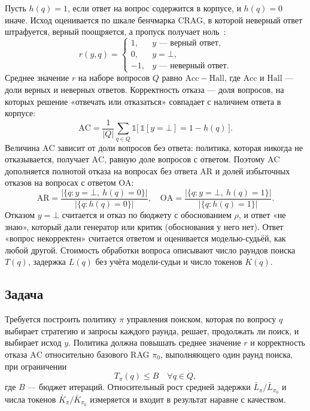 \documentclass{misisarticle}
\begin{document}
Пусть $h(q) = 1$, если ответ на вопрос содержится в корпусе, и $h(q) = 0$ иначе.
Исход оценивается по шкале бенчмарка CRAG, в которой неверный ответ штрафуется, верный поощряется, а пропуск получает ноль~\cite{yang2024crag}: %
\begin{equation}
  r(y, q) =
  \begin{cases}
    1, & y \text{ --- верный ответ},\\
    0, & y = \bot,\\
    -1, & y \text{ --- неверный ответ}.
  \end{cases}
  \label{eq:score}
\end{equation}
Среднее значение $r$ на наборе вопросов $Q$ равно $\mathrm{Acc} - \mathrm{Hall}$, где $\mathrm{Acc}$ и $\mathrm{Hall}$ --- доли верных и неверных ответов.
Корректность отказа --- доля вопросов, на которых решение «отвечать или отказаться» совпадает с наличием ответа в корпусе:
\begin{equation}
  \mathrm{AC} = \frac{1}{|Q|} \sum_{q \in Q} \mathbb{1}\bigl[\, \mathbb{1}[y = \bot] = 1 - h(q) \,\bigr].
  \label{eq:ac}
\end{equation}
Величина $\mathrm{AC}$ зависит от доли вопросов без ответа: политика, которая никогда не отказывается, получает $\mathrm{AC}$, равную доле вопросов с ответом.
Поэтому $\mathrm{AC}$ дополняется полнотой отказа на вопросах без ответа $\mathrm{AR}$ и долей избыточных отказов на вопросах с ответом $\mathrm{OA}$:
\begin{equation}
  \mathrm{AR} = \frac{|\{q : y = \bot,\ h(q) = 0\}|}{|\{q : h(q) = 0\}|}, \quad
  \mathrm{OA} = \frac{|\{q : y = \bot,\ h(q) = 1\}|}{|\{q : h(q) = 1\}|}.
  \label{eq:ar-oa}
\end{equation}
Отказом $y = \bot$ считается и отказ по бюджету с обоснованием $\rho$, и ответ «не знаю», который дали генератор или критик (обоснования у него нет).
Ответ «вопрос некорректен» считается ответом и оценивается моделью-судьёй, как любой другой.
Стоимость обработки вопроса описывают число раундов поиска $T(q)$, задержка $L(q)$ без учёта модели-судьи и число токенов $K(q)$.

\subsection{Задача}

Требуется построить политику $\pi$ управления поиском, которая по вопросу $q$ выбирает стратегию и запросы каждого раунда, решает, продолжать ли поиск, и выбирает исход $y$.
Политика должна повышать среднее значение $r$ и корректность отказа $\mathrm{AC}$ относительно базового RAG $\pi_0$, выполняющего один раунд поиска, при ограничении
\begin{equation}
  T_{\pi}(q) \le B \quad \forall q \in Q,
  \label{eq:budget}
\end{equation}
где $B$ --- бюджет итераций.
Относительный рост средней задержки $\bar{L}_{\pi} / \bar{L}_{\pi_0}$ и числа токенов $\bar{K}_{\pi} / \bar{K}_{\pi_0}$ измеряется и входит в результат наравне с качеством.
\end{document}
